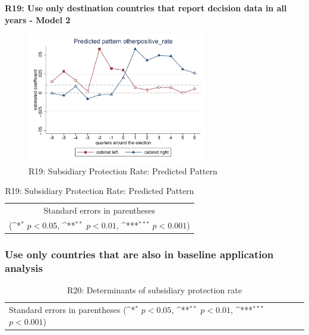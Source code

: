 \documentclass[10pt,a4paper]{scrartcl}
\begin{document}
\clearpage
\textbf{R19: Use only destination countries that report decision data in all years - Model 2}
\begin{figure}[!ht]
	\centering
	\includegraphics[width=0.7\textwidth]{figures_edited/otherpositive_rate_graph2_R19.pdf}
	\caption{R19: Subsidiary Protection Rate: Predicted Pattern}
\end{figure}

\begin{table}[!ht]\centering
	\footnotesize
	\renewcommand{\arraystretch}{1.2}
	\def\sym#1{\ifmmode^{#1}\else\(^{#1}\)\fi}
	\caption{R19: Subsidiary Protection Rate: Predicted Pattern}
	\begin{tabular}{l*{2}{c}}
		\hline\hline
		
		\hline\hline
		\multicolumn{3}{c}{\footnotesize Standard errors in parentheses} \\
		\multicolumn{3}{c}{\footnotesize (\sym{*} \(p<0.05\), \sym{**} \(p<0.01\), \sym{***} \(p<0.001\))} \\
	\end{tabular}
\end{table}





\clearpage
\FloatBarrier
\subsubsection{Use only countries that are also in baseline application analysis}
\begin{table}[!ht]\centering
	\renewcommand{\arraystretch}{1.25}
	\small
	\def\sym#1{\ifmmode^{#1}\else\(^{#1}\)\fi}
	\caption{R20: Determinants of subsidiary protection rate}
	\begin{tabular}{l*{3}{c}}
		\hline\hline
		
		\hline\hline
		\multicolumn{4}{l}{\footnotesize Standard errors in parentheses (\sym{*} \(p<0.05\), \sym{**} \(p<0.01\), \sym{***} \(p<0.001\))}\\
	\end{tabular}
\end{table}
\end{document}
